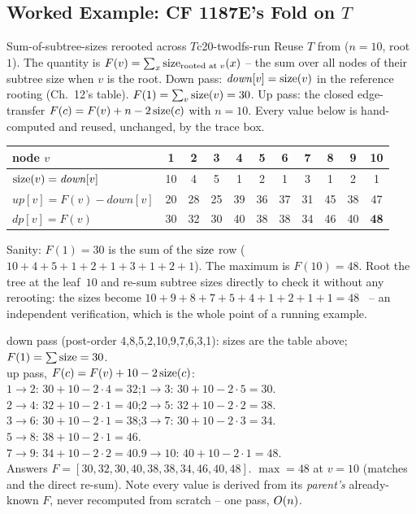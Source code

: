 \subsection{Worked Example: CF 1187E's Fold on $T$}

\begin{example}{Sum-of-subtree-sizes rerooted across $T$}{c20-twodfs-run}
Reuse $T$ from  ($n=10$, root $1$). The quantity is
$F(v) = \sum_{x} \operatorname{size}_{\text{rooted at }v}(x)$ -- the sum over all nodes of
their subtree size when $v$ is the root. Down pass: $\mathit{down}[v]=\operatorname{size}(v)$
in the reference rooting (Ch.~12's table). $F(1)=\sum_v\operatorname{size}(v)=30$. Up pass: the
closed edge-transfer $F(c)=F(v)+n-2\operatorname{size}(c)$ with $n=10$. Every value below is
hand-computed and reused, unchanged, by the trace box.
\end{example}

\begin{center}
\small
\renewcommand{\arraystretch}{1.2}
\begin{tabular}{l|cccccccccc}
\toprule
node $v$ & 1 & 2 & 3 & 4 & 5 & 6 & 7 & 8 & 9 & 10 \\
\midrule
$\operatorname{size}(v)=\mathit{down}[v]$ & 10 & 4 & 5 & 1 & 2 & 1 & 3 & 1 & 2 & 1 \\
$\mathit{up}[v]=F(v)-\mathit{down}[v]$ & 20 & 28 & 25 & 39 & 36 & 37 & 31 & 45 & 38 & 47 \\
$\mathit{dp}[v]=F(v)$ & 30 & 32 & 30 & 40 & 38 & 38 & 34 & 46 & 40 & \textbf{48} \\
\bottomrule
\end{tabular}
\end{center}

\noindent Sanity: $F(1)=30$ is the sum of the $\operatorname{size}$ row
($10{+}4{+}5{+}1{+}2{+}1{+}3{+}1{+}2{+}1$). The maximum is $F(10)=48$. Root the
tree at the leaf~$10$ and re-sum subtree sizes directly to check it without any
rerooting: the sizes become $10{+}9{+}8{+}7{+}5{+}4{+}1{+}2{+}1{+}1=48$
\checkmark\ -- an independent verification, which is the whole point of a
running example.

\begin{tracebox}[Edge-transfer on $T$, children visited in numeric order, $n=10$]
down pass (post-order 4,8,5,2,10,9,7,6,3,1): sizes are the table above;
$F(1)=\sum\operatorname{size}=30$.\\
up pass, $F(c)=F(v)+10-2\operatorname{size}(c)$:\\
$1\!\to\!2$: $30+10-2{\cdot}4=32$;\quad $1\!\to\!3$: $30+10-2{\cdot}5=30$.\\
$2\!\to\!4$: $32+10-2{\cdot}1=40$;\quad $2\!\to\!5$: $32+10-2{\cdot}2=38$.\\
$3\!\to\!6$: $30+10-2{\cdot}1=38$;\quad $3\!\to\!7$: $30+10-2{\cdot}3=34$.\\
$5\!\to\!8$: $38+10-2{\cdot}1=46$.\\
$7\!\to\!9$: $34+10-2{\cdot}2=40$.\quad $9\!\to\!10$: $40+10-2{\cdot}1=48$.\\
Answers $F=[30,32,30,40,38,38,34,46,40,48]$. $\max=48$ at $v=10$ \checkmark
(matches  and the direct re-sum). Note every value is
derived from its \emph{parent's} already-known $F$, never recomputed from
scratch -- one pass, $O(n)$. \checkmark
\end{tracebox}

